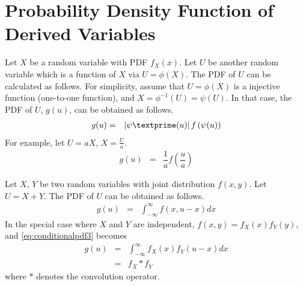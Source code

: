 \section{Probability Density Function of Derived Variables}

Let $X$ be a random variable with PDF $f_X(x)$. Let $U$ be another random variable which is a function of $X$ via $U=\phi(X)$. The PDF of $U$ can be calculated as follows. For simplicity, assume that $U=\phi(X)$ is a injective function (one-to-one function), and $X=\phi^{-1}(U)=\psi(U)$. In that case, the PDF of $U$, $g(u)$, can be obtained as follows.
\begin{eqnarray}
  g(u) &=& \left|\psi\textprime(u)\right|f\left(\psi(u)\right) \nonumber
\end{eqnarray}
For example, let $U=aX$, $X=\frac{U}{a}$.
\begin{eqnarray}
  g(u) &=& \dfrac{1}{a}f\left(\dfrac{u}{a}\right) \nonumber
\end{eqnarray}

Let $X$, $Y$ be two random variables with joint distribution $f(x, y)$. Let $U=X+Y$. The PDF of $U$ can be obtained as follows.
\begin{eqnarray}
  g(u) &=& \int_{-\infty}^{\infty} f(x, u-x)dx \label{eq:conditionalpdf3}
\end{eqnarray}
In the special case where $X$ and $Y$ are independent, $f(x, y) = f_X(x)f_Y(y)$, and \eqref{eq:conditionalpdf3} becomes
\begin{eqnarray}
  g(u) &=& \int_{-\infty}^{\infty} f_X(x)f_Y(u-x)dx \nonumber \\
  &=& f_X * f_Y \nonumber
\end{eqnarray}
where $*$ denotes the convolution operator.
